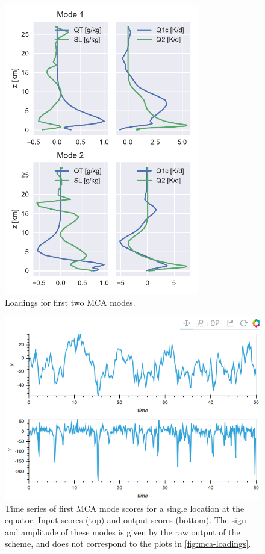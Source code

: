 \documentclass{report}
\newcommand{\1}[1]{\mathds{1}\left[#1\right]}
\begin{document}
\begin{figure}
  \centering
  \includegraphics[height=5in]{images/mca_modes.pdf}
  \caption{Loadings for first two MCA modes.}
  \label{fig:mca-loadings}
\end{figure}
\begin{figure}
  \centering
  \includegraphics[width=\textwidth]{images/mca_ts.png}
  \caption{Time series of first MCA mode scores for a single location at the
    equator. 
    Input scores (top) and output scores (bottom). 
    The sign and amplitude of these modes is given by the raw output of the
    scheme, and does not correspond to the plots in \autoref{fig:mca-loadings}.}
  \label{fig:mca-ts}
\end{figure}
\end{document}
